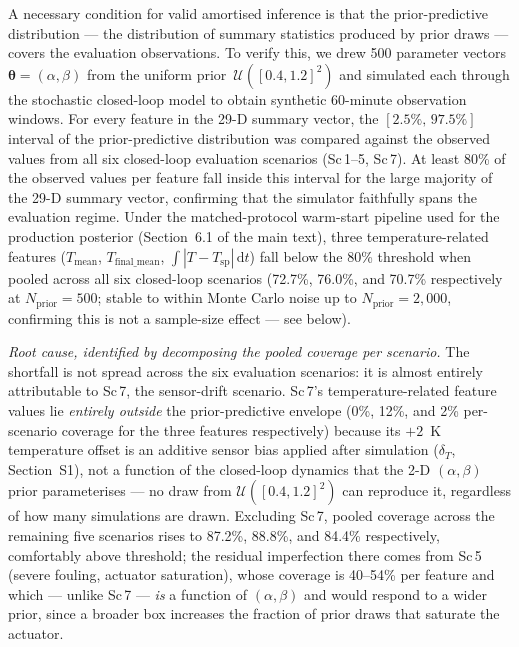 \documentclass[aps,pre,twocolumn,superscriptaddress]{revtex4-2}
\begin{document}
A necessary condition for valid amortised inference is that the prior-predictive
distribution --- the distribution of summary statistics produced by prior draws ---
covers the evaluation observations.  To verify this, we drew 500 parameter vectors
$\boldsymbol{\theta}=(\alpha,\beta)$ from the uniform prior~$\mathcal{U}([0.4,1.2]^2)$
and simulated each through the stochastic closed-loop model to obtain synthetic
60-minute observation windows.  For every feature in the 29-D summary vector, the
$[2.5\%,\,97.5\%]$ interval of the prior-predictive distribution was compared against
the observed values from all six closed-loop evaluation scenarios (Sc\,1--5, Sc\,7).
At least 80\% of the observed values per feature fall inside this interval for the large
majority of the 29-D summary vector, confirming that the simulator faithfully spans the
evaluation regime. Under the matched-protocol warm-start pipeline used for the
production posterior (Section~6.1 of the main text), three temperature-related features
($T_\mathrm{mean}$, $T_\mathrm{final\_mean}$, $\int|T-T_\mathrm{sp}|\,\mathrm{d}t$) fall
below the 80\% threshold when pooled across all six closed-loop scenarios (72.7\%,
76.0\%, and 70.7\% respectively at $N_\mathrm{prior}=500$; stable to within Monte Carlo
noise up to $N_\mathrm{prior}=2{,}000$, confirming this is not a sample-size effect ---
see below).

\textit{Root cause, identified by decomposing the pooled coverage per scenario.} The
shortfall is not spread across the six evaluation scenarios: it is almost entirely
attributable to Sc\,7, the sensor-drift scenario. Sc\,7's temperature-related feature
values lie \emph{entirely outside} the prior-predictive envelope (0\%, 12\%, and 2\%
per-scenario coverage for the three features respectively) because its $+2$~K
temperature offset is an additive sensor bias applied after simulation
($\delta_T$, Section~S1), not a function of the closed-loop dynamics that the
2-D $(\alpha,\beta)$ prior parameterises --- no draw from $\mathcal{U}([0.4,1.2]^2)$
can reproduce it, regardless of how many simulations are drawn. Excluding Sc\,7,
pooled coverage across the remaining five scenarios rises to 87.2\%, 88.8\%, and
84.4\% respectively, comfortably above threshold; the residual imperfection there
comes from Sc\,5 (severe fouling, actuator saturation), whose coverage is 40--54\%
per feature and which --- unlike Sc\,7 --- \emph{is} a function of $(\alpha,\beta)$
and would respond to a wider prior, since a broader box increases the fraction of
prior draws that saturate the actuator.
\end{document}
